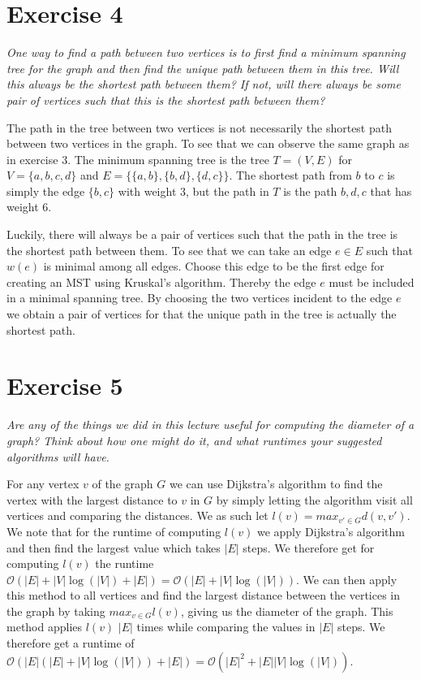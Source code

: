 \documentclass{article}
\begin{document}
\section*{Exercise 4}
\emph{One way to find a path between two vertices is to first find a minimum spanning tree for the graph and then find the unique path between them in this tree. Will this always be the shortest path between them? If not, will there always be some pair of vertices such that this is the shortest path between them?}
\vspace{0.4cm}

The path in the tree between two vertices is not necessarily the shortest path between two vertices in the graph. To see that we can observe the same graph as in exercise 3. The minimum spanning tree is the tree $T = (V,E)$ for $V = \{a,b,c,d\}$ and $E = \{\{a,b\}, \{b,d\}, \{d,c\}\}$. The shortest path from $b$ to $c$ is simply the edge $\{b,c\}$ with weight 3, but the path in $T$ is the path $b,d,c$ that has weight 6.

Luckily, there will always be a pair of vertices such that the path in the tree is the shortest path between them. To see that we can take an edge $e \in E$ such that $w(e)$ is minimal among all edges. Choose this edge to be the first edge for creating an MST using Kruskal's algorithm. Thereby the edge $e$ must be included in a minimal spanning tree. By choosing the two vertices incident to the edge $e$ we obtain a pair of vertices for that the unique path in the tree is actually the shortest path.

\section*{Exercise 5}
\emph{Are any of the things we did in this lecture useful for computing the diameter of a graph? Think about how one might do it, and what runtimes your suggested algorithms will have.}
\vspace{0.4cm}

For any vertex $v$ of the graph $G$ we can use Dijkstra's algorithm to find the vertex with the largest distance to $v$ in $G$ by simply letting the algorithm visit all vertices and comparing the distances. We as such let $l(v) = max_{v' \in G} d(v, v')$. We note that for the runtime of computing $l(v)$ we apply Dijkstra’s algorithm and then find the largest value which takes $|E|$ steps. We therefore get for computing $l(v)$ the runtime $\mathcal{O}(|E| + |V|\log(|V|) + |E|) = \mathcal{O}(|E| + |V|\log(|V|))$. We can then apply this method to all vertices and find the largest distance between the vertices in the graph by taking $max_{v \in G} l(v)$, giving us the diameter of the graph. This method applies $l(v)$ $|E|$ times while comparing the values in $|E|$ steps. We therefore get a runtime of $\mathcal{O}(|E|(|E| + |V|\log(|V|)) + |E|) = \mathcal{O}(|E|^2 + |E||V|\log(|V|))$.
\end{document}
